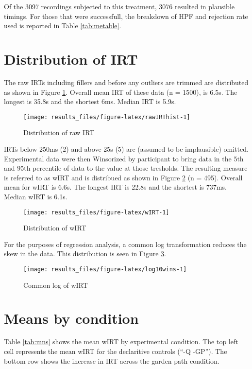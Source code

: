 \documentclass[]{tufte-handout}
\begin{document}
Of the 3097 recordings subjected to this treatment, 3076 resulted in
plausible timings. For those that were successfull, the breakdown of HPF
and rejection rate used is reported in Table \ref{tab:metable}.

\section{Distribution of IRT}\label{distribution-of-irt}

The raw IRTs including fillers and before any outliers are trimmed are
distributed as shown in Figure \ref{fig:rawIRThist}. Overall mean IRT of
these data (n = 1500), is 6.5s. The longest is 35.8s and the shortest
6ms. Median IRT is 5.9s.

\begin{figure}
\texttt{[image: results\_files/figure-latex/rawIRThist-1]} \caption[Distribution of raw IRT]{Distribution of raw IRT}\label{fig:rawIRThist}
\end{figure}

IRTs below 250ms (2) and above 25s (5) are (assumed to be implausible)
omitted. Experimental data were then Winsorized by participant to bring
data in the 5th and 95th percentile of data to the value at those
tresholds. The resulting measure is referred to as wIRT and is
distribued as shown in Figure \ref{fig:wIRT} (n = 495). Overall mean for
wIRT is 6.6s. The longest IRT is 22.8s and the shortest is 737ms. Median
wIRT is 6.1s.

\begin{figure}
\texttt{[image: results\_files/figure-latex/wIRT-1]} \caption[Distribution of wIRT]{Distribution of wIRT}\label{fig:wIRT}
\end{figure}

For the purposes of regression analysis, a common log transformation
reduces the skew in the data. This distribution is seen in Figure
\ref{fig:log10wins}.

\begin{figure}
\texttt{[image: results\_files/figure-latex/log10wins-1]} \caption[Common log of wIRT]{Common log of wIRT}\label{fig:log10wins}
\end{figure}

\section{Means by condition}\label{means-by-condition}

Table \ref{tab:mns} shows the mean wIRT by experimental condition. The
top left cell represents the mean wIRT for the declaritive controls
(``-Q -GP''). The bottom row shows the increase in IRT across the garden
path condition.
\end{document}
